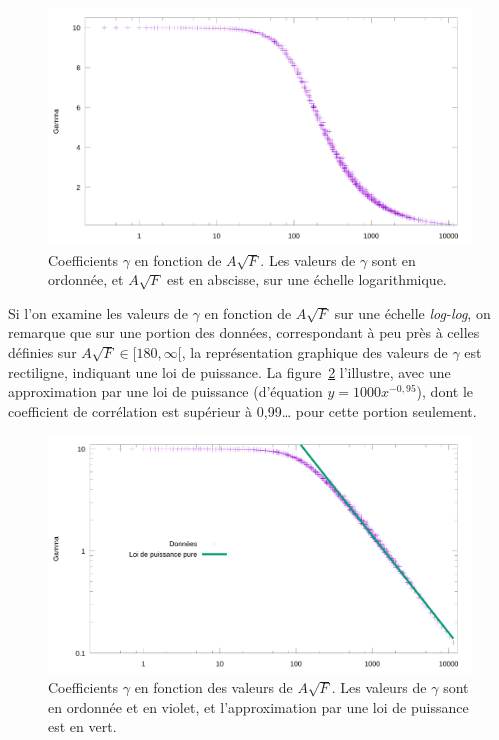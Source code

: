 	\begin{figure}[!htb]
		\centering
		\includegraphics[width=\textwidth]{figures/ch4/asqrtFVgammaLog}
		\caption[Coefficients $\gamma$ en fonction de F et A, ter (log)]{Coefficients $\gamma$ en fonction de $A\sqrt{F}$. Les valeurs de $\gamma$ sont en ordonnée, et $A\sqrt{F}$ est en abscisse, sur une échelle logarithmique.}
		\label{fig:gammaASQRTFlog}
	\end{figure}
	
	Si l'on examine les valeurs de $\gamma$ en fonction de $A\sqrt{F}$ sur une échelle \emph{log-log}, on remarque que sur une portion des données, correspondant à peu près à celles définies sur $A\sqrt{F} \in [180,\infty[$, la représentation graphique des valeurs de $\gamma$ est rectiligne, indiquant une loi de puissance. La figure~\ref{fig:asqrtFVgammaLogLogUnbrokenPowerFit} l'illustre, avec une approximation par une loi de puissance (d'équation $y = 1000x^{-0,95}$), dont le coefficient de corrélation est supérieur à 0,99\ldots{} pour cette portion seulement.
	
	\begin{figure}[!htb]
		\centering
		\includegraphics[width=\textwidth]{figures/ch4/asqrtFVgammaLogLogUnbrokenPowerFit}
		\caption[Coefficients $\gamma$ en fonction de F et A, quater (log-log)]{Coefficients $\gamma$ en fonction des valeurs de $A\sqrt{F}$. Les valeurs de $\gamma$ sont en ordonnée et en violet, et l'approximation par une loi de puissance est en vert.}
		\label{fig:asqrtFVgammaLogLogUnbrokenPowerFit}
	\end{figure}
	
